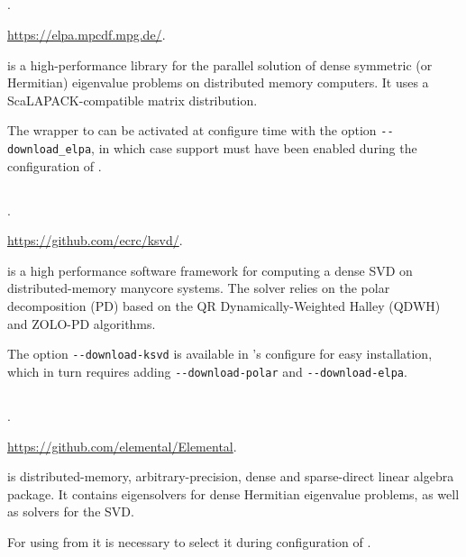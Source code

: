 \subsection*{\underline{\elpa}}
\begin{description}
\setlength{\itemsep}{0pt}
\item[References.]\citep{Auckenthaler:2011:ELP}.
\item[Website.] \url{https://elpa.mpcdf.mpg.de/}.
\item[Summary.] \elpa is a high-performance library for the parallel solution of dense symmetric (or Hermitian) eigenvalue problems on distributed memory computers. It uses a ScaLAPACK-compatible matrix distribution.
\item[Installation.] The \slepc wrapper to \elpa can be activated at configure time with the option \texttt{-{}-download\_elpa}, in which case \scalapack support must have been enabled during the configuration of \petsc.
\end{description}

\subsection*{\underline{\ksvd}}
\begin{description}
\setlength{\itemsep}{0pt}
\item[References.]\citep{Sukkari:2019:QDW}.
\item[Website.] \url{https://github.com/ecrc/ksvd/}.
\item[Summary.] \ksvd is a high performance software framework for computing a dense SVD on distributed-memory manycore systems. The \ksvd solver relies on the polar decomposition (PD) based on the QR Dynamically-Weighted Halley (QDWH) and ZOLO-PD algorithms.
\item[Installation.] The option \texttt{-{}-download-ksvd} is available in \slepc's configure for easy installation, which in turn requires adding \texttt{-{}-download-polar} and \texttt{-{}-download-elpa}.
\end{description}

\subsection*{\underline{\elemental}}
\begin{description}
\setlength{\itemsep}{0pt}
\item[References.]\citep{Poulson:2013:ELE}.
\item[Website.] \url{https://github.com/elemental/Elemental}.
\item[Summary.] \elemental is distributed-memory, arbitrary-precision, dense and sparse-direct linear algebra package. It contains eigensolvers for dense Hermitian eigenvalue problems, as well as solvers for the SVD.
\item[Installation.] For using \elemental from \slepc it is necessary to select it during configuration of \petsc.
\end{description}


